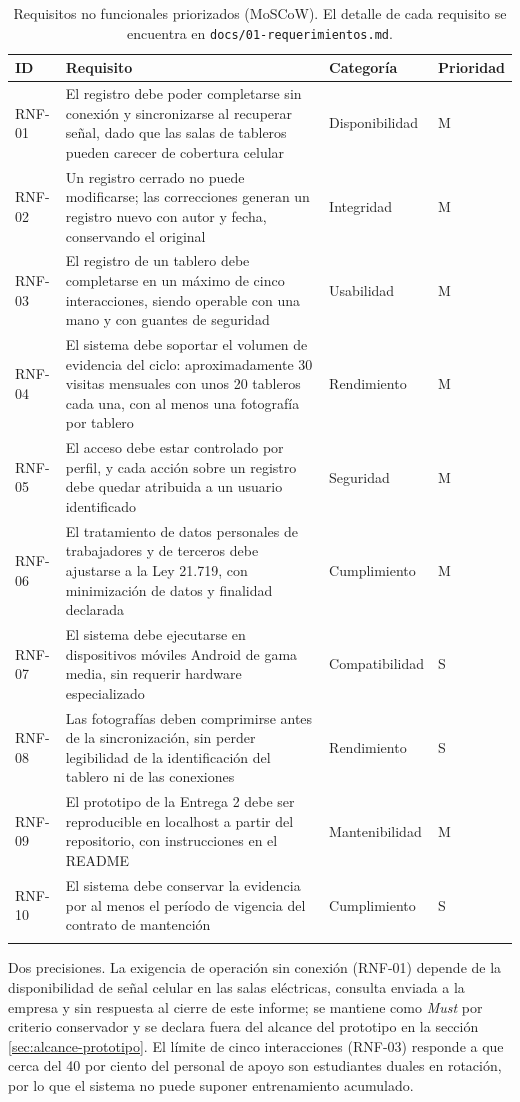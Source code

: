 \documentclass[10pt,letterpaper]{article}
\begin{document}
\begin{longtable}{@{}p{1.6cm}p{8.2cm}p{2.4cm}p{1.6cm}@{}}
\toprule
\textbf{ID} & \textbf{Requisito} & \textbf{Categoría} & \textbf{Prioridad} \\
\midrule
\endhead
RNF-01 & El registro debe poder completarse sin conexión y sincronizarse al recuperar señal, dado que las salas de tableros pueden carecer de cobertura celular & Disponibilidad & M \\
RNF-02 & Un registro cerrado no puede modificarse; las correcciones generan un registro nuevo con autor y fecha, conservando el original & Integridad & M \\
RNF-03 & El registro de un tablero debe completarse en un máximo de cinco interacciones, siendo operable con una mano y con guantes de seguridad & Usabilidad & M \\
RNF-04 & El sistema debe soportar el volumen de evidencia del ciclo: aproximadamente 30 visitas mensuales con unos 20 tableros cada una, con al menos una fotografía por tablero & Rendimiento & M \\
RNF-05 & El acceso debe estar controlado por perfil, y cada acción sobre un registro debe quedar atribuida a un usuario identificado & Seguridad & M \\
RNF-06 & El tratamiento de datos personales de trabajadores y de terceros debe ajustarse a la Ley 21.719, con minimización de datos y finalidad declarada & Cumplimiento & M \\
RNF-07 & El sistema debe ejecutarse en dispositivos móviles Android de gama media, sin requerir hardware especializado & Compatibilidad & S \\
RNF-08 & Las fotografías deben comprimirse antes de la sincronización, sin perder legibilidad de la identificación del tablero ni de las conexiones & Rendimiento & S \\
RNF-09 & El prototipo de la Entrega 2 debe ser reproducible en localhost a partir del repositorio, con instrucciones en el README & Mantenibilidad & M \\
RNF-10 & El sistema debe conservar la evidencia por al menos el período de vigencia del contrato de mantención & Cumplimiento & S \\
\bottomrule
\caption{Requisitos no funcionales priorizados (MoSCoW). El detalle de cada requisito
se encuentra en \texttt{docs/01-requerimientos.md}.}
\end{longtable}

Dos precisiones. La exigencia de operación sin conexión (RNF-01) depende de la
disponibilidad de señal celular en las salas eléctricas, consulta enviada a la empresa
y sin respuesta al cierre de este informe; se mantiene como \emph{Must} por criterio
conservador y se declara fuera del alcance del prototipo en la sección
\ref{sec:alcance-prototipo}. El límite de cinco interacciones (RNF-03) responde a que
cerca del 40 por ciento del personal de apoyo son estudiantes duales en rotación, por
lo que el sistema no puede suponer entrenamiento acumulado.
\end{document}
